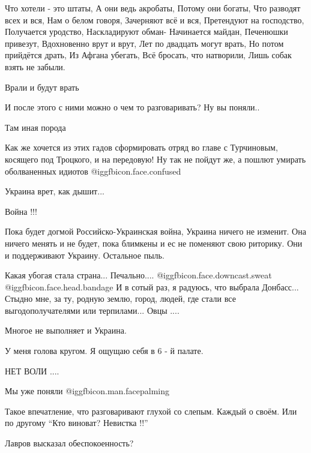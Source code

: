 \begin{itemize}

\obeycr
Что хотели - это штаты,
А они ведь акробаты,
Потому они богаты,
Что разводят всех и вся,
Нам о белом говоря,
Зачерняют всё и вся,
Претендуют на господство,
Получается уродство,
Наскладируют обман-
Начинается майдан,
Печенюшки привезут,
Вдохновенно врут и врут,
Лет по двадцать могут врать,
Но потом прийдётся драть,
Из Афгана убегать,
Всё бросать, что натворили,
Лишь собак взять не забыли.
\restorecr


Врали и будут врать

И после этого с ними можно о чем то разговаривать? Ну вы поняли..

Там иная порода


Как же хочется из этих гадов сформировать отряд во главе с Турчиновым, косящего
под Троцкого, и на передовую! Ну так не пойдут же, а пошлют умирать
оболваненных идиотов @igg{fbicon.face.confused} 

Украина врет, как дышит...

Война !!!


Пока будет догмой Российско-Украинская война, Украина ничего не изменит. Она
ничего менять и не будет, пока блимкены и ес не поменяют свою риторику. Они и
поддерживают Украину. Остальное пыль.



Какая убогая стала страна... Печально.... @igg{fbicon.face.downcast.sweat}
@igg{fbicon.face.head.bandage}  И в сотый раз, я радуюсь, что выбрала
Донбасс... Стыдно мне, за ту, родную землю, город, людей, где стали все
выгодополучателями или терпилами... Овцы ....


Многое не выполняет и Украина.

У меня голова кругом. Я ощущаю себя в 6 - й палате.

НЕТ ВОЛИ ....

Мы уже поняли  @igg{fbicon.man.facepalming} 


Такое впечатление, что разговаривают глухой со слепым. Каждый о своём. Или по
другому \enquote{Кто виноват? Невистка !!}


Лавров высказал обеспокоенность?


\end{itemize}
